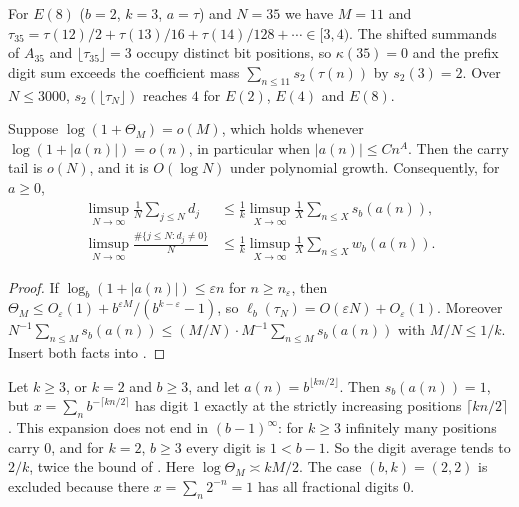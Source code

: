 \documentclass[11pt]{article}
\begin{document}
\begin{example}\label{ex:plus-one}
For $E(8)$ ($b=2$, $k=3$, $a=\tau$) and $N=35$ we have $M=11$ and $\tau_{35}=\tau(12)/2+\tau(13)/16+\tau(14)/128+\cdots\in[3,4)$. The shifted summands of $A_{35}$ and $\lfloor\tau_{35}\rfloor=3$ occupy distinct bit positions, so $\kappa(35)=0$ and the prefix digit sum exceeds the coefficient mass $\sum_{n\le11}s_2(\tau(n))$ by $s_2(3)=2$. Over $N\le3000$, $s_2(\lfloor\tau_N\rfloor)$ reaches $4$ for $E(2)$, $E(4)$ and $E(8)$.
\end{example}

\begin{corollary}\label{cor:asymptotic}
Suppose $\log(1+\Theta_M)=o(M)$, which holds whenever $\log(1+|a(n)|)=o(n)$, in particular when $|a(n)|\le Cn^A$. Then the carry tail is $o(N)$, and it is $O(\log N)$ under polynomial growth. Consequently, for $a\ge0$,
\begin{align*}
\limsup_{N\to\infty}\frac1N\sum_{j\le N}d_j&\le\frac1k\limsup_{X\to\infty}\frac1X\sum_{n\le X}s_b(a(n)),\\
\limsup_{N\to\infty}\frac{\#\{j\le N:d_j\ne0\}}N&\le\frac1k\limsup_{X\to\infty}\frac1X\sum_{n\le X}w_b(a(n)).
\end{align*}
\end{corollary}

\begin{proof}
If $\log_b(1+|a(n)|)\le\varepsilon n$ for $n\ge n_\varepsilon$, then $\Theta_M\le O_\varepsilon(1)+b^{\varepsilon M}/(b^{k-\varepsilon}-1)$, so $\ell_b(\tau_N)=O(\varepsilon N)+O_\varepsilon(1)$. Moreover $N^{-1}\sum_{n\le M}s_b(a(n))\le(M/N)\cdot M^{-1}\sum_{n\le M}s_b(a(n))$ with $M/N\le1/k$. Insert both facts into .
\end{proof}

\begin{example}\label{ex:growth}
Let $k\ge3$, or $k=2$ and $b\ge3$, and let $a(n)=b^{\lfloor kn/2\rfloor}$. Then $s_b(a(n))=1$, but $x=\sum_nb^{-\lceil kn/2\rceil}$ has digit $1$ exactly at the strictly increasing positions $\lceil kn/2\rceil$. This expansion does not end in $(b-1)^\infty$: for $k\ge3$ infinitely many positions carry $0$, and for $k=2$, $b\ge3$ every digit is $1<b-1$. So the digit average tends to $2/k$, twice the bound of . Here $\log\Theta_M\asymp kM/2$. The case $(b,k)=(2,2)$ is excluded because there $x=\sum_n2^{-n}=1$ has all fractional digits $0$.
\end{example}
\end{document}

